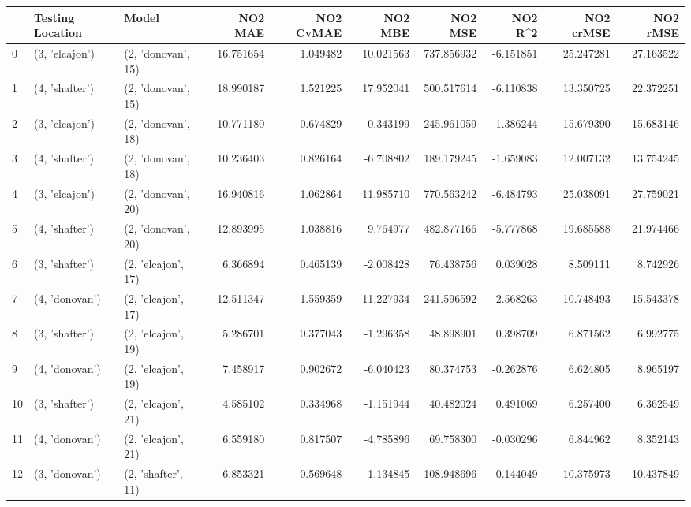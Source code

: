 \begin{tabular}{lllrrrrrrr}
\toprule
{} & Testing Location &               Model &    NO2 MAE &  NO2 CvMAE &    NO2 MBE &      NO2 MSE &    NO2 R\textasciicircum2 &  NO2 crMSE &   NO2 rMSE \\
\midrule
0  &   (3, 'elcajon') &  (2, 'donovan', 15) &  16.751654 &   1.049482 &  10.021563 &   737.856932 &  -6.151851 &  25.247281 &  27.163522 \\
1  &   (4, 'shafter') &  (2, 'donovan', 15) &  18.990187 &   1.521225 &  17.952041 &   500.517614 &  -6.110838 &  13.350725 &  22.372251 \\
2  &   (3, 'elcajon') &  (2, 'donovan', 18) &  10.771180 &   0.674829 &  -0.343199 &   245.961059 &  -1.386244 &  15.679390 &  15.683146 \\
3  &   (4, 'shafter') &  (2, 'donovan', 18) &  10.236403 &   0.826164 &  -6.708802 &   189.179245 &  -1.659083 &  12.007132 &  13.754245 \\
4  &   (3, 'elcajon') &  (2, 'donovan', 20) &  16.940816 &   1.062864 &  11.985710 &   770.563242 &  -6.484793 &  25.038091 &  27.759021 \\
5  &   (4, 'shafter') &  (2, 'donovan', 20) &  12.893995 &   1.038816 &   9.764977 &   482.877166 &  -5.777868 &  19.685588 &  21.974466 \\
6  &   (3, 'shafter') &  (2, 'elcajon', 17) &   6.366894 &   0.465139 &  -2.008428 &    76.438756 &   0.039028 &   8.509111 &   8.742926 \\
7  &   (4, 'donovan') &  (2, 'elcajon', 17) &  12.511347 &   1.559359 & -11.227934 &   241.596592 &  -2.568263 &  10.748493 &  15.543378 \\
8  &   (3, 'shafter') &  (2, 'elcajon', 19) &   5.286701 &   0.377043 &  -1.296358 &    48.898901 &   0.398709 &   6.871562 &   6.992775 \\
9  &   (4, 'donovan') &  (2, 'elcajon', 19) &   7.458917 &   0.902672 &  -6.040423 &    80.374753 &  -0.262876 &   6.624805 &   8.965197 \\
10 &   (3, 'shafter') &  (2, 'elcajon', 21) &   4.585102 &   0.334968 &  -1.151944 &    40.482024 &   0.491069 &   6.257400 &   6.362549 \\
11 &   (4, 'donovan') &  (2, 'elcajon', 21) &   6.559180 &   0.817507 &  -4.785896 &    69.758300 &  -0.030296 &   6.844962 &   8.352143 \\
12 &   (3, 'donovan') &  (2, 'shafter', 11) &   6.853321 &   0.569648 &   1.134845 &   108.948696 &   0.144049 &  10.375973 &  10.437849 \\

\end{tabular}
